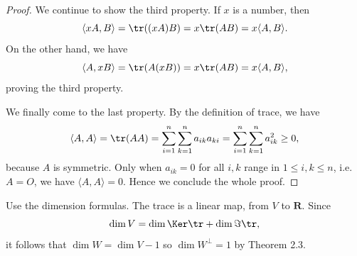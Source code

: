 {{\begin{Solution}
{\begin{proof}
                We continue to show the third property. 
                If $x$ is a number, then 
                \begin{equation*}
                    \langle xA, B \rangle = \tr((xA)B) = x \tr(AB) = x \langle A, B \rangle. 
                \end{equation*}
                On the other hand, we have 
                \begin{equation*}
                    \langle A, xB \rangle = \tr(A(xB)) = x \tr(AB) = x \langle A, B \rangle, 
                \end{equation*}
                proving the third property. 

                We finally come to the last property. 
                By the definition of trace, we have 
                \begin{equation*}
                    \langle A, A \rangle = \tr(AA) = \sum_{i=1}^n \sum_{k=1}^n a_{ik}a_{ki} = \sum_{i=1}^n \sum_{k=1}^n a_{ik}^2 \geq 0, 
                \end{equation*}
                because $A$ is symmetric. 
                Only when $a_{ik} = 0$ for all $i, k$ range in $1 \leq i, k \leq n$, i.e. $A = O$, we have $\langle A, A \rangle = 0$. 
                Hence we conclude the whole proof. 
            \end{proof}
            \item 
            Use the dimension formulas. 
            The trace is a linear map, from $V$ to $\mathbf{R}$. 
            Since 
            \begin{equation*}
                \dim V = \dim \Ker \tr + \dim \Im \tr, 
            \end{equation*}
            it follows that $\dim W = \dim V - 1$ so $\dim W^{\perp} = 1$ by Theorem 2.3. 

}
\end{Solution}}}
